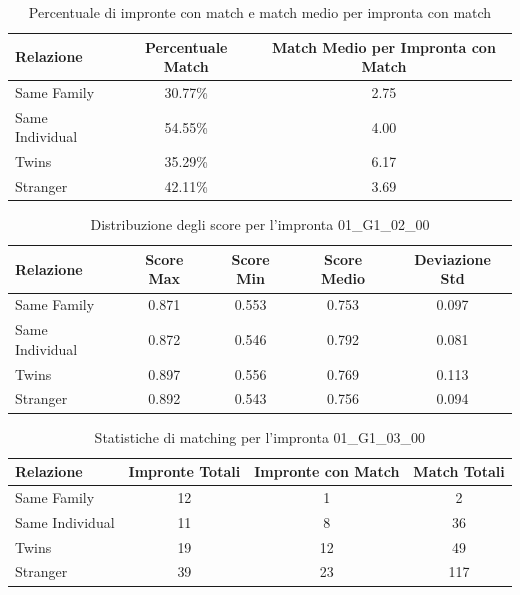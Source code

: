 \begin{table}[htbp]
\centering
\caption{Percentuale di impronte con match e match medio per impronta con match}
\label{tab:match_percentage_01_G1_02_00}
\begin{tabular}{|l|c|c|}
\hline
\textbf{Relazione} & \textbf{Percentuale Match} & \textbf{Match Medio per Impronta con Match} \\
\hline
Same Family & 30.77\% & 2.75 \\
\hline
Same Individual & 54.55\% & 4.00 \\
\hline
Twins & 35.29\% & 6.17 \\
\hline
Stranger & 42.11\% & 3.69 \\
\hline
\end{tabular}
\end{table}


\begin{table}[htbp]
\centering
\caption{Distribuzione degli score per l'impronta 01\_G1\_02\_00}
\label{tab:scores_01_G1_02_00}
\begin{tabular}{|l|c|c|c|c|}
\hline
\textbf{Relazione} & \textbf{Score Max} & \textbf{Score Min} & \textbf{Score Medio} & \textbf{Deviazione Std} \\
\hline
Same Family & 0.871 & 0.553 & 0.753 & 0.097 \\
\hline
Same Individual & 0.872 & 0.546 & 0.792 & 0.081 \\
\hline
Twins & 0.897 & 0.556 & 0.769 & 0.113 \\
\hline
Stranger & 0.892 & 0.543 & 0.756 & 0.094 \\
\hline
\end{tabular}
\end{table}


\begin{table}[htbp]
\centering
\caption{Statistiche di matching per l'impronta 01\_G1\_03\_00}
\label{tab:results_01_G1_03_00}
\begin{tabular}{|l|c|c|c|}
\hline
\textbf{Relazione} & \textbf{Impronte Totali} & \textbf{Impronte con Match} & \textbf{Match Totali} \\
\hline
Same Family & 12 & 1 & 2 \\
\hline
Same Individual & 11 & 8 & 36 \\
\hline
Twins & 19 & 12 & 49 \\
\hline
Stranger & 39 & 23 & 117 \\
\hline
\end{tabular}
\end{table}


